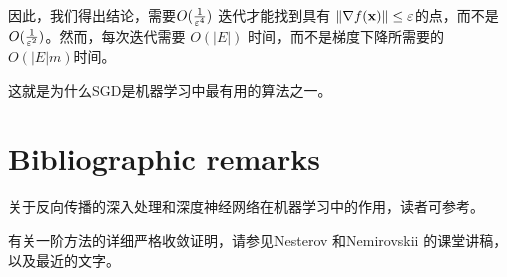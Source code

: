 因此，我们得出结论，需要$O(\frac{1}{\varepsilon^4})$ 迭代才能找到具有 $\|\nabla f(\mathbf x)\| \leq \varepsilon$的点，而不是 $O(\frac{1}{\varepsilon^2})$。然而，每次迭代需要 $O(|E|)$ 时间，而不是梯度下降所需要的 $O(|E| m)$时间。

这就是为什么SGD是机器学习中最有用的算法之一。




\newpage
\section{Bibliographic remarks}



关于反向传播的深入处理和深度神经网络在机器学习中的作用，读者可参考\cite{Goodfellow-et-al-2016}。

有关一阶方法的详细严格收敛证明，请参见Nesterov \cite{NesterovBook} 和Nemirovskii \cite{NY83,Nemirovski04lectures}的课堂讲稿，以及最近的文字\cite{bubeckOPT}。











